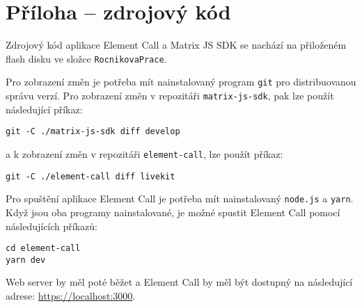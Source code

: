 \section{Příloha -- zdrojový kód}\label{attachment}

Zdrojový kód aplikace Element Call a Matrix JS SDK se nachází na přiloženém
flash disku ve složce \texttt{RocnikovaPrace}.

Pro zobrazení změn je potřeba mít nainstalovaný program \texttt{git}
pro distribuovanou správu verzí. Pro zobrazení změn v repozitáři
\texttt{matrix-js-sdk}, pak lze použít následující příkaz:
\begin{verbatim}
git -C ./matrix-js-sdk diff develop
\end{verbatim}

a k zobrazení změn v repozitáři \texttt{element-call}, lze použít příkaz:
\begin{verbatim}
git -C ./element-call diff livekit
\end{verbatim}

Pro spuštění aplikace Element Call je potřeba mít nainstalovaný \texttt{node.js} a
\texttt{yarn}. Když jsou oba programy nainstalované, je možné spustit
Element Call pomocí následujících příkazů:

\begin{verbatim}
cd element-call
yarn dev
\end{verbatim}

Web server by měl poté běžet a Element Call by měl být dostupný na následující
adrese: \href{https://localhost:3000}{https://localhost:3000}.
